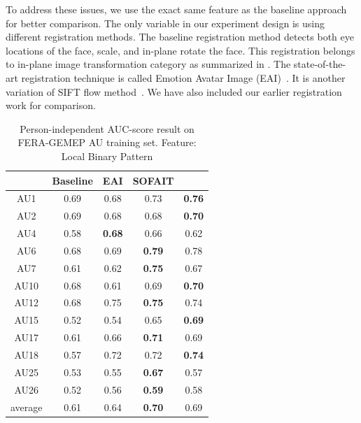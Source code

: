 \documentclass[10pt,journal]{IEEEtran}
\begin{document}
To address these issues, we use the exact same feature as the baseline approach for better comparison. The only variable in our experiment design is using different registration methods. The baseline registration method detects both eye locations of the face, scale, and in-plane rotate the face. This registration belongs to in-plane image transformation category as summarized in \cite{Yang_SMCB12}. The state-of-the-art registration technique is called Emotion Avatar Image (EAI)~\cite{Yang_SMCB12}. It is another variation of SIFT flow method~\cite{Liu_PAMI11}. We have also included our earlier registration work \cite{Yang_FG13} for comparison.


\begin{table}[htbp]
\caption{Person-independent AUC-score result on FERA-GEMEP AU training set. Feature: Local Binary Pattern}
\begin{center}
\label{table:fera_lbp}
\begin{tabular}{|c|cccc|}
\hline
& \pbox{10cm}{Baseline \\\cite{Valstar_FERA11}}	&\pbox{10cm}{EAI \\\cite{Yang_SMCB12}}	&\pbox{10cm}{SOFAIT \\\cite{Yang_FG13}}	&\pbox{10cm}{SOFIT}	\\ \hline
AU1		&0.69	&0.68	&0.73	&\textbf{0.76}\cellcolor[gray]{0.9}	\\ 
AU2		&0.69	&0.68	&0.68	&\textbf{0.70}\cellcolor[gray]{0.9}	\\
AU4		&0.58	&\textbf{0.68}\cellcolor[gray]{0.9}	&0.66	&0.62 \\
AU6		&0.68	&0.69	&\textbf{0.79}\cellcolor[gray]{0.9}	&0.78	\\
AU7		&0.61	&0.62	&\textbf{0.75}\cellcolor[gray]{0.9}	&0.67 \\
AU10	&0.68	&0.61	&0.69	&\textbf{0.70}\cellcolor[gray]{0.9} \\
AU12	&0.68	&0.75	&\textbf{0.75}\cellcolor[gray]{0.9}	&0.74 \\
AU15	&0.52	&0.54	&0.65	&\textbf{0.69}\cellcolor[gray]{0.9} \\
AU17	&0.61	&0.66	&\textbf{0.71}\cellcolor[gray]{0.9}	&0.69 \\
AU18	&0.57	&0.72	&0.72	&\textbf{0.74}\cellcolor[gray]{0.9} \\
AU25	&0.53	&0.55	&\textbf{0.67}\cellcolor[gray]{0.9}	&0.57 \\
AU26	&0.52	&0.56	&\textbf{0.59}\cellcolor[gray]{0.9}	&0.58 \\ \hline
average	&0.61	&0.64	&\textbf{0.70}\cellcolor[gray]{0.9}	&0.69 \\ \hline

\end{tabular}
\end{center}
\end{table}
\end{document}
